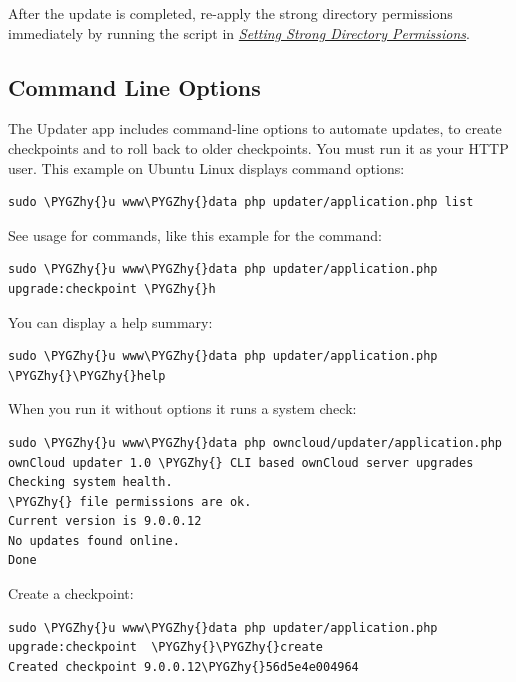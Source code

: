 \documentclass[letterpaper,10pt,english]{sphinxmanual}
\def\PYGZhy{\char`\-}
\begin{document}
After the update is completed, re-apply the strong directory permissions
immediately by running the script in {\hyperref[installation/installation_wizard:strong-perms-label]{\emph{Setting Strong Directory Permissions}}}.


\subsection{Command Line Options}
\label{maintenance/update:updater-cli-label}\label{maintenance/update:command-line-options}
The Updater app includes command-line options to automate updates, to create
checkpoints and to roll back to older checkpoints. You must run it as your HTTP
user. This example on Ubuntu Linux displays command options:

\begin{Verbatim}[commandchars=\\\{\}]
sudo \PYGZhy{}u www\PYGZhy{}data php updater/application.php list
\end{Verbatim}

See usage for commands, like this example for the 
command:

\begin{Verbatim}[commandchars=\\\{\}]
sudo \PYGZhy{}u www\PYGZhy{}data php updater/application.php upgrade:checkpoint \PYGZhy{}h
\end{Verbatim}

You can display a help summary:

\begin{Verbatim}[commandchars=\\\{\}]
sudo \PYGZhy{}u www\PYGZhy{}data php updater/application.php \PYGZhy{}\PYGZhy{}help
\end{Verbatim}

When you run it without options it runs a system check:

\begin{Verbatim}[commandchars=\\\{\}]
sudo \PYGZhy{}u www\PYGZhy{}data php owncloud/updater/application.php
ownCloud updater 1.0 \PYGZhy{} CLI based ownCloud server upgrades
Checking system health.
\PYGZhy{} file permissions are ok.
Current version is 9.0.0.12
No updates found online.
Done
\end{Verbatim}

Create a checkpoint:

\begin{Verbatim}[commandchars=\\\{\}]
sudo \PYGZhy{}u www\PYGZhy{}data php updater/application.php upgrade:checkpoint  \PYGZhy{}\PYGZhy{}create
Created checkpoint 9.0.0.12\PYGZhy{}56d5e4e004964
\end{Verbatim}
\end{document}
